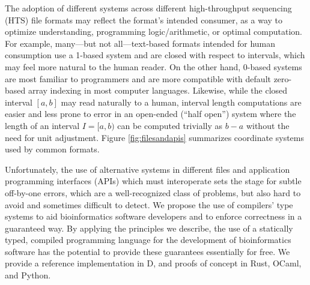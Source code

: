 \documentclass[12pt]{article}
\begin{document}
The adoption of different systems across different high-throughput sequencing (HTS) file formats may reflect the format's intended consumer, as a way to optimize understanding, programming logic/arithmetic, or optimal computation. For example, many---but not all---text-based formats intended for human consumption use a 1-based system and are closed with respect to intervals, which may feel more natural to the human reader. On the other hand, 0-based systems are most familiar to programmers and are more compatible with default zero-based array indexing in most computer languages. Likewise, while the closed interval $[a,b]$ may read naturally to a human, interval length computations are easier and less prone to error in an open-ended (``half open'') system where the length of an interval $I=[a,b)$ can be computed trivially as $b-a$ without the need for unit adjustment. Figure \ref{fig:filesandapis} summarizes coordinate systems used by common formats.

Unfortunately, the use of alternative systems in different files and application programming interfaces (APIs) which must interoperate sets the stage for subtle off-by-one errors, which are a well-recognized class of problems, but also hard to avoid and sometimes difficult to detect.\cite{CWE193} We propose the use of compilers' type systems to aid bioinformatics software developers and to enforce correctness in a guaranteed way. By applying the principles we describe, the use of a statically typed, compiled programming language for the development of bioinformatics software has the potential to provide these guarantees essentially for free. We provide a reference implementation in D, and proofs of concept in Rust, OCaml, and Python.


\end{document}
